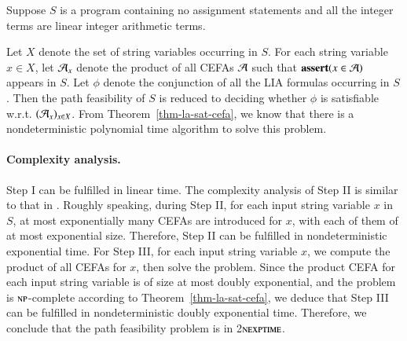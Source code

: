 \smallskip

Suppose $S$ is a {\slint} program containing no assignment statements and all the integer terms are linear integer arithmetic terms. 

Let $X$ denote the set of string variables occurring in $S$.
For each string variable $x \in X$, let $\mathcal{A}_x$ denote the product of all CEFAs $\mathcal{A}$ such that $\textbf{assert}(x \in \mathcal{A})$ appears in $S$. Let $\phi$ denote the conjunction of all the LIA formulas occurring in $S$. Then the path feasibility of $S$ is reduced to deciding whether $\phi$ is satisfiable w.r.t. $(\mathcal{A}_x)_{x \in X}$. From Theorem~\ref{thm-la-sat-cefa}, we know that there is a nondeterministic polynomial time algorithm to solve this problem.


\paragraph*{Complexity analysis.} Step I can be fulfilled in linear time. The complexity analysis of Step II is similar to that in \cite{CHL+19}. Roughly speaking, during Step II, for each input string variable $x$ in $S$, at most exponentially many CEFAs are introduced for $x$, with each of them of at most exponential size. Therefore, Step II can be fulfilled in nondeterministic exponential time. For Step III, for each input string variable $x$, we compute the product of all CEFAs for $x$, then solve the {\lasat} problem. Since the product CEFA for each input string variable is of size at most doubly exponential, and the {\lasat} problem is $\textsc{np}$-complete according to  Theorem~\ref{thm-la-sat-cefa}, we deduce that Step III can be fulfilled in  nondeterministic doubly exponential time. Therefore, we conclude that the path feasibility problem is in 2$\textsc{nexptime}$. 







